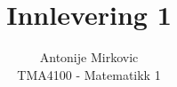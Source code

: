 \documentclass[10pt]{article}
\newenvironment{Oppgave}[2][Oppgave]{\begin{trivlist}
\item[\hskip \labelsep {\bfseries #1}\hskip \labelsep {\bfseries #2.}]}{\end{trivlist}}
\begin{document}
\title{Innlevering 1}
\author{Antonije Mirkovic\\
TMA4100 - Matematikk 1}
\maketitle
\begin{Oppgave}{1}

\end{Oppgave}

\begin{Oppgave}{2}

\end{Oppgave}

\begin{Oppgave}{3}

\end{Oppgave}

\begin{Oppgave}{4}

\end{Oppgave}

\begin{Oppgave}{5}

\end{Oppgave}

\begin{Oppgave}{6}

\end{Oppgave}
\begin{Oppgave}{7}

\end{Oppgave}
\end{document}

